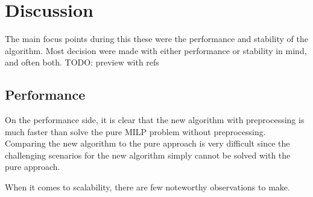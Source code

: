 \chapter{Discussion}
The main focus points during this these were the performance and stability of the algorithm. Most decision were made with either performance or stability in mind, and often both. TODO: preview with refs
\section{Performance}
On the performance side, it is clear that the new algorithm with preprocessing is much faster than solve the pure MILP problem without preprocessing. Comparing the new algorithm to the pure approach is very difficult since the challenging scenarios for the new algorithm simply cannot be solved with the pure approach.
\par
When it comes to scalability, there are few noteworthy observations to make. 

